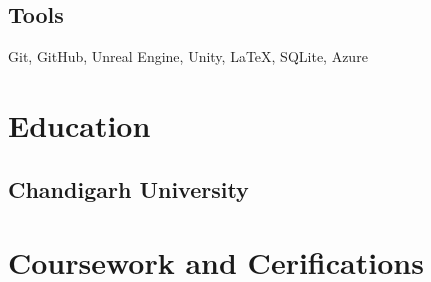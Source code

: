 \documentclass[]{absolute}
\begin{document}
\begin{minipage}[t]{0.3\textwidth}
    \subsection{Tools}
    \sectionsep
    Git, GitHub, Unreal Engine, Unity, \LaTeX, SQLite, Azure
    \sectionsep


    \section{Education}

    \sectionsep
    \subsection{Chandigarh University}
    \sectionsep





    \section{Coursework and Cerifications}


\end{minipage}
\end{document}
